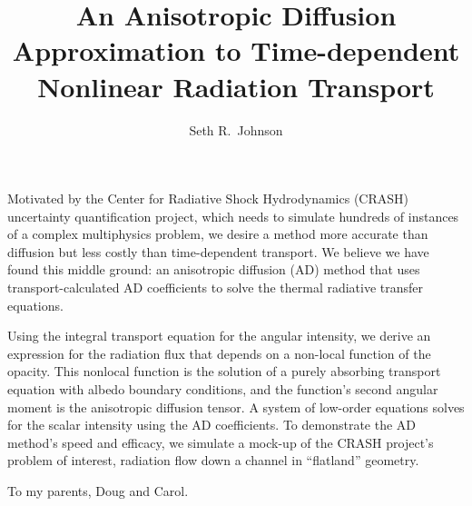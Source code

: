 \documentclass[12pt, letterpaper, draft]{umthesis}
\author{Seth R.~Johnson}
\title{An Anisotropic Diffusion Approximation to Time-dependent Nonlinear
Radiation Transport}
\begin{document}
\frontmatter

\maketitle

\begin{finalabstract}
Motivated by the Center for Radiative Shock Hydrodynamics (CRASH) uncertainty
quantification project, which needs to simulate hundreds of instances of a
complex multiphysics problem, we desire a method more accurate than diffusion
but less costly than time-dependent transport. We believe we have found this
middle ground: an anisotropic diffusion (AD) method that uses
transport-calculated AD coefficients to solve the thermal radiative transfer
equations.

Using the integral transport equation for the angular intensity, we derive an
expression for the radiation flux that depends on a non-local function of the
opacity. This nonlocal function is the solution of a purely absorbing transport
equation with albedo boundary conditions, and the function's second angular
moment is the anisotropic diffusion tensor. A system of low-order equations
solves for the scalar intensity using the AD coefficients. To demonstrate the
AD method's speed and efficacy, we simulate a mock-up of the CRASH project's
problem of interest, radiation flow down a channel in ``flatland'' geometry.

\end{finalabstract}
\makecopyright


\begin{dedication}
  To my parents, Doug and Carol.
\end{dedication}
\end{document}
